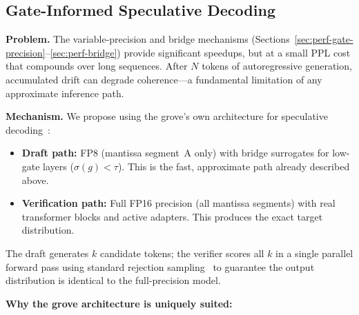 \documentclass{article}
\begin{document}
\subsection{Gate-Informed Speculative Decoding}
\label{sec:perf-speculative}

\textbf{Problem.} The variable-precision and bridge mechanisms
(Sections~\ref{sec:perf-gate-precision}--\ref{sec:perf-bridge}) provide
significant speedups, but at a small PPL cost that compounds over long
sequences. After $N$ tokens of autoregressive generation, accumulated
drift can degrade coherence---a fundamental limitation of any
approximate inference path.

\textbf{Mechanism.} We propose using the grove's own architecture
for speculative decoding~\cite{speculative2022,speculative2023}:

\begin{itemize}[nosep,leftmargin=1.5em]
\item \textbf{Draft path:} FP8 (mantissa segment~A only) with bridge
      surrogates for low-gate layers ($\sigma(g) < \tau$). This is the
      fast, approximate path already described above.
\item \textbf{Verification path:} Full FP16 precision (all mantissa
      segments) with real transformer blocks and active adapters. This
      produces the exact target distribution.
\end{itemize}

The draft generates $k$ candidate tokens; the verifier scores all $k$ in
a single parallel forward pass using standard rejection
sampling~\cite{speculative2022} to guarantee the output distribution is
identical to the full-precision model.

\textbf{Why the grove architecture is uniquely suited:}
\end{document}

